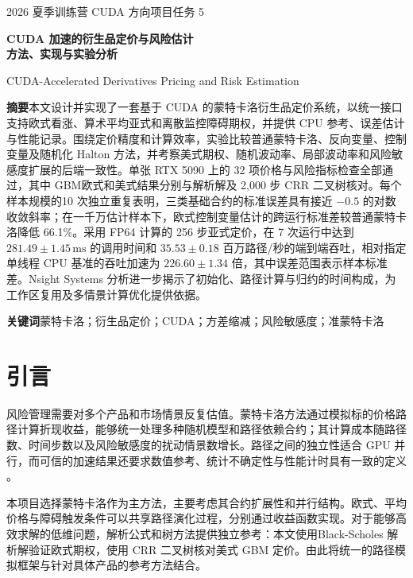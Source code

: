 \documentclass[UTF8,a4paper,zihao=5,fontset=none]{ctexart}
\begin{document}
\thispagestyle{empty}
\begin{center}
{\small 2026 夏季训练营 CUDA 方向项目\quad 任务 5}\par
\vspace{11pt}
{\LARGE\bfseries CUDA 加速的衍生品定价与风险估计\\[3pt]方法、实现与实验分析\par}
\vspace{8pt}
{\normalsize CUDA-Accelerated Derivatives Pricing and Risk Estimation\par}
\end{center}
\vspace{4pt}
\noindent\textbf{摘\quad 要}\quad 本文设计并实现了一套基于 CUDA 的蒙特卡洛衍生品定价系统，以统一接口支持欧式看涨、算术平均亚式和离散监控障碍期权，并提供 CPU 参考、误差估计与性能记录。围绕定价精度和计算效率，实验比较普通蒙特卡洛、反向变量、控制变量及随机化 Halton 方法，并考察美式期权、随机波动率、局部波动率和风险敏感度扩展的后端一致性。单张 RTX 5090 上的 32 项价格与风险指标检查全部通过，其中 GBM欧式和美式结果分别与解析解及 2,000 步 CRR 二叉树核对。每个样本规模的10 次独立重复表明，三类基础合约的标准误差具有接近 $-0.5$ 的对数收敛斜率；在一千万估计样本下，欧式控制变量估计的跨运行标准差较普通蒙特卡洛降低 66.1\%。采用 FP64 计算的 256 步亚式定价，在 7 次运行中达到$281.49\pm1.45\,\mathrm{ms}$ 的调用时间和 $35.53\pm0.18$ 百万路径/秒的端到端吞吐，相对指定单线程 CPU 基准的吞吐加速为 $226.60\pm1.34$ 倍，其中误差范围表示样本标准差。Nsight Systems 分析进一步揭示了初始化、路径计算与归约的时间构成，为工作区复用及多情景计算优化提供依据。\par
\vspace{5pt}
\noindent\textbf{关键词}\quad  蒙特卡洛；衍生品定价；CUDA；方差缩减；风险敏感度；准蒙特卡洛\par
\vspace{6pt}
\section{引言}

风险管理需要对多个产品和市场情景反复估值。蒙特卡洛方法通过模拟标的价格路径计算折现收益，能够统一处理多种随机模型和路径依赖合约；其计算成本随路径数、时间步数以及风险敏感度的扰动情景数增长。路径之间的独立性适合 GPU 并行，而可信的加速结果还要求数值参考、统计不确定性与性能计时具有一致的定义 \cite{r1,r2,r3}。


本项目选择蒙特卡洛作为主方法，主要考虑其合约扩展性和并行结构。欧式、平均价格与障碍触发条件可以共享路径演化过程，分别通过收益函数实现。对于能够高效求解的低维问题，解析公式和树方法提供独立参考：本文使用Black-Scholes 解析解验证欧式期权，使用 CRR 二叉树核对美式 GBM 定价。由此将统一的路径模拟框架与针对具体产品的参考方法结合。
\end{document}
